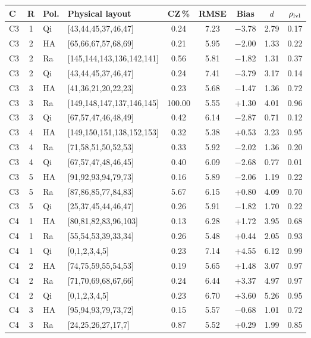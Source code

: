 \begin{tabular}[t]{@{}lclp{2.75cm}ccccc@{}}
\toprule
C & R & Pol. & Physical layout & CZ\,\% & RMSE & Bias & $d$ & $\rho_{\rm lvl}$ \\
\midrule
C3 & 1 & Qi & [43,44,45,37,46,47] & 0.24 & 7.23 & $-$3.78 & 2.79 & 0.17 \\
C3 & 2 & HA & [65,66,67,57,68,69] & 0.21 & 5.95 & $-$2.00 & 1.33 & 0.22 \\
C3 & 2 & Ra & [145,144,143,136,142,141] & 0.56 & 5.81 & $-$1.82 & 1.31 & 0.37 \\
C3 & 2 & Qi & [43,44,45,37,46,47] & 0.24 & 7.41 & $-$3.79 & 3.17 & 0.14 \\
C3 & 3 & HA & [41,36,21,20,22,23] & 0.23 & 5.68 & $-$1.47 & 1.36 & 0.72 \\
C3 & 3 & Ra & [149,148,147,137,146,145] & 100.00 & 5.55 & +1.30 & 4.01 & 0.96 \\
C3 & 3 & Qi & [67,57,47,46,48,49] & 0.42 & 6.14 & $-$2.87 & 0.71 & 0.12 \\
C3 & 4 & HA & [149,150,151,138,152,153] & 0.32 & 5.38 & +0.53 & 3.23 & 0.95 \\
C3 & 4 & Ra & [71,58,51,50,52,53] & 0.33 & 5.92 & $-$2.02 & 1.36 & 0.20 \\
C3 & 4 & Qi & [67,57,47,48,46,45] & 0.40 & 6.09 & $-$2.68 & 0.77 & 0.01 \\
C3 & 5 & HA & [91,92,93,94,79,73] & 0.16 & 5.89 & $-$2.06 & 1.19 & 0.22 \\
C3 & 5 & Ra & [87,86,85,77,84,83] & 5.67 & 6.15 & +0.80 & 4.09 & 0.70 \\
C3 & 5 & Qi & [25,37,45,44,46,47] & 0.26 & 5.91 & $-$1.82 & 1.70 & 0.22 \\
C4 & 1 & HA & [80,81,82,83,96,103] & 0.13 & 6.28 & +1.72 & 3.95 & 0.68 \\
C4 & 1 & Ra & [55,54,53,39,33,34] & 0.26 & 5.48 & +0.44 & 2.05 & 0.93 \\
C4 & 1 & Qi & [0,1,2,3,4,5] & 0.23 & 7.14 & +4.55 & 6.12 & 0.99 \\
C4 & 2 & HA & [74,75,59,55,54,53] & 0.19 & 5.65 & +1.48 & 3.07 & 0.97 \\
C4 & 2 & Ra & [71,70,69,68,67,66] & 0.24 & 6.44 & +3.37 & 4.97 & 0.97 \\
C4 & 2 & Qi & [0,1,2,3,4,5] & 0.23 & 6.70 & +3.60 & 5.26 & 0.95 \\
C4 & 3 & HA & [95,94,93,79,73,72] & 0.15 & 5.57 & $-$0.68 & 1.01 & 0.72 \\
C4 & 3 & Ra & [24,25,26,27,17,7] & 0.87 & 5.52 & +0.29 & 1.99 & 0.85 \\

\end{tabular}
